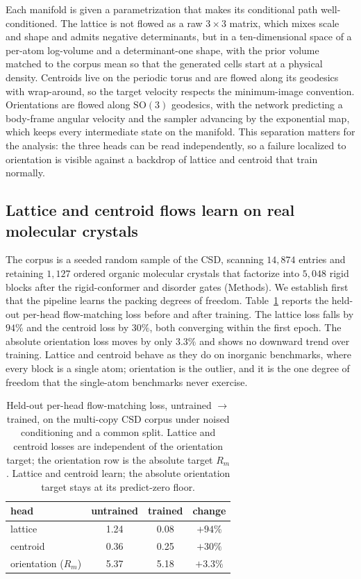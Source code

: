 \documentclass[10pt]{article}
\begin{document}
Each manifold is given a parametrization that makes its conditional path
well-conditioned. The lattice is not flowed as a raw $3\times3$ matrix, which
mixes scale and shape and admits negative determinants, but in a ten-dimensional
space of a per-atom log-volume and a determinant-one shape, with the prior
volume matched to the corpus mean so that the generated cells start at a
physical density. Centroids live on the periodic torus and are flowed along its
geodesics with wrap-around, so the target velocity respects the minimum-image
convention. Orientations are flowed along $\mathrm{SO}(3)$ geodesics, with the
network predicting a body-frame angular velocity and the sampler advancing by the
exponential map, which keeps every intermediate state on the manifold. This
separation matters for the analysis: the three heads can be read independently,
so a failure localized to orientation is visible against a backdrop of lattice
and centroid that train normally.

\subsection{Lattice and centroid flows learn on real molecular crystals}

The corpus is a seeded random sample of the CSD, scanning $14{,}874$ entries and
retaining $1{,}127$ ordered organic molecular crystals that factorize into
$5{,}048$ rigid blocks after the rigid-conformer and disorder gates (Methods).
We establish first that the pipeline learns the packing degrees of freedom.
Table~\ref{tab:perhead} reports the held-out per-head flow-matching loss before
and after training. The lattice loss falls by $94\%$ and the centroid loss by
$30\%$, both converging within the first epoch. The absolute orientation loss
moves by only $3.3\%$ and shows no downward trend over training. Lattice and
centroid behave as they do on inorganic benchmarks, where every block is a single
atom; orientation is the outlier, and it is the one degree of freedom that the
single-atom benchmarks never exercise.

\begin{table}[t]
\centering
\caption{Held-out per-head flow-matching loss, untrained $\rightarrow$ trained,
on the multi-copy CSD corpus under noised conditioning and a common split.
Lattice and centroid losses are independent of the orientation target; the
orientation row is the absolute target $R_m$. Lattice and centroid learn; the
absolute orientation target stays at its predict-zero floor.}
\label{tab:perhead}
\begin{tabular}{lccc}
\toprule
head & untrained & trained & change \\
\midrule
lattice            & 1.24 & 0.08 & $+94\%$ \\
centroid           & 0.36 & 0.25 & $+30\%$ \\
orientation ($R_m$)& 5.37 & 5.18 & $+3.3\%$ \\
\bottomrule
\end{tabular}
\end{table}
\end{document}
